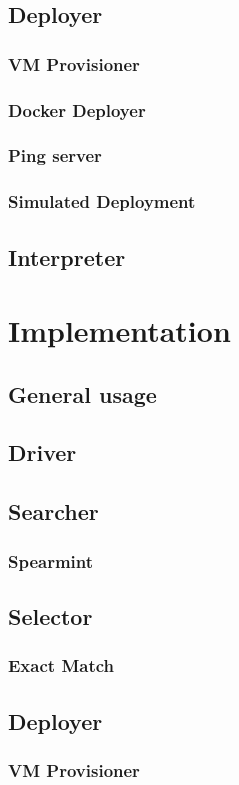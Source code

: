 \documentclass{report}
\begin{document}
\section{Deployer}
\subsection{VM Provisioner}
\subsection{Docker Deployer}
\subsection{Ping server}
\subsection{Simulated Deployment}
\section{Interpreter}
\chapter{Implementation}
\section{General usage}
\section{Driver}
\section{Searcher}
\subsection{Spearmint}
\section{Selector}
\subsection{Exact Match}
\section{Deployer}
\subsection{VM Provisioner}
\end{document}
